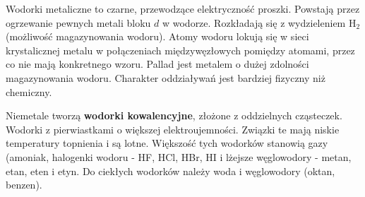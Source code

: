 \documentclass{article}
\begin{document}
Wodorki metaliczne to czarne, przewodzące elektryczność proszki. Powstają przez ogrzewanie pewnych metali bloku $d$ w wodorze. Rozkładają się z wydzieleniem H$_2$ (możliwość magazynowania wodoru). Atomy wodoru lokują się w sieci krystalicznej metalu w połączeniach międzywęzłowych pomiędzy atomami, przez co nie mają konkretnego wzoru. Pallad jest metalem o dużej zdolności magazynowania wodoru. Charakter oddziaływań jest bardziej fizyczny niż chemiczny.

Niemetale tworzą \textbf{wodorki kowalencyjne}, złożone z oddzielnych cząsteczek. Wodorki z pierwiastkami o większej elektroujemności. Związki te mają niskie temperatury topnienia i są lotne. Większość tych wodorków stanowią gazy (amoniak, halogenki wodoru - HF, HCl, HBr, HI i lżejsze węglowodory - metan, etan, eten i etyn. Do ciekłych wodorków należy woda i węglowodory (oktan, benzen). \\
\end{document}
